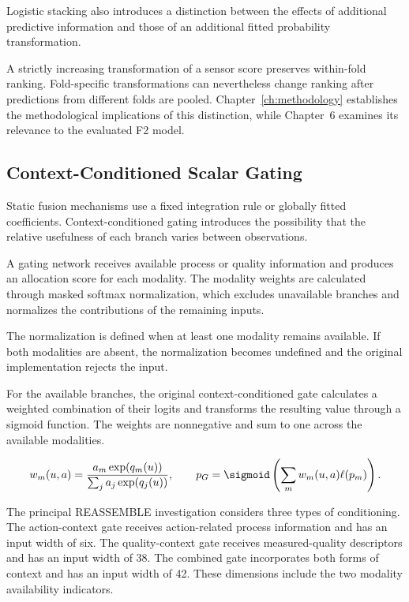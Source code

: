 Logistic stacking also introduces a distinction between the effects of additional predictive information and those of an additional fitted probability transformation.

A strictly increasing transformation of a sensor score preserves within-fold ranking. Fold-specific transformations can nevertheless change ranking after predictions from different folds are pooled. Chapter~\ref{ch:methodology} establishes the methodological implications of this distinction, while Chapter~6 examines its relevance to the evaluated F2 model.

\subsection{Context-Conditioned Scalar Gating}

Static fusion mechanisms use a fixed integration rule or globally fitted coefficients. Context-conditioned gating introduces the possibility that the relative usefulness of each branch varies between observations.

A gating network receives available process or quality information and produces an allocation score for each modality. The modality weights are calculated through masked softmax normalization, which excludes unavailable branches and normalizes the contributions of the remaining inputs.

The normalization is defined when at least one modality remains available. If both modalities are absent, the normalization becomes undefined and the original implementation rejects the input.

For the available branches, the original context-conditioned gate calculates a weighted combination of their logits and transforms the resulting value through a sigmoid function. The weights are nonnegative and sum to one across the available modalities.

\begin{equation}
 w_m(u,a)=\frac{a_m\exp(q_m(u))}{\sum_j a_j\exp(q_j(u))},\qquad
 p_G=\sigmoid\left(\sum_m w_m(u,a)\ell(p_m)\right).
 \label{eq:gate}
\end{equation}

The principal REASSEMBLE investigation considers three types of conditioning. The action-context gate receives action-related process information and has an input width of six. The quality-context gate receives measured-quality descriptors and has an input width of 38. The combined gate incorporates both forms of context and has an input width of 42. These dimensions include the two modality availability indicators.

